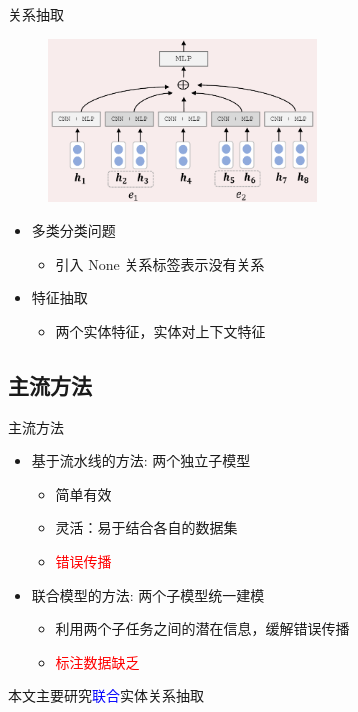 \documentclass{beamer}
\begin{document}
\begin{frame}{关系抽取}
    \begin{figure}[t]
        \begin{center}
            \includegraphics[width=2.8in]{images/relation}
        \end{center}
    \end{figure}

    \begin{itemize}
        \item 多类分类问题 
            \begin{itemize}
                \item 引入 None 关系标签表示没有关系
            \end{itemize}
        \item 特征抽取
            \begin{itemize}
                \item 两个实体特征，实体对上下文特征
            \end{itemize}
    \end{itemize}
\end{frame}

\subsection*{主流方法}
\begin{frame}{主流方法}

	\begin{itemize}
		\item 基于流水线的方法: 两个独立子模型
            \begin{itemize}
                \item \textcolor{truecolor}{ 简单有效}
                \item \textcolor{truecolor}{灵活：易于结合各自的数据集}
                \item \textcolor{red}{错误传播}
            \end{itemize}
        \item 联合模型的方法: 两个子模型统一建模
            \begin{itemize}
                \item \textcolor{truecolor}{利用两个子任务之间的潜在信息，缓解错误传播}
                \item \textcolor{red}{标注数据缺乏}
            \end{itemize}
	\end{itemize}
    \begin{center}
    本文主要研究\textcolor{blue}{联合}实体关系抽取
    \end{center}
\end{frame}
\end{document}
